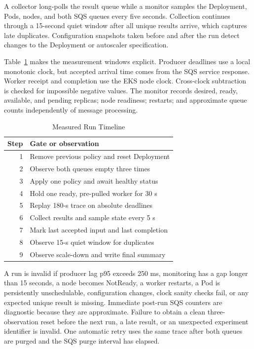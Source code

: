 \documentclass[conference]{IEEEtran}
\begin{document}
A collector long-polls the result queue while a monitor samples the Deployment,
Pods, nodes, and both SQS queues every five seconds. Collection continues through
a 15-second quiet window after all unique results arrive, which captures late
duplicates. Configuration snapshots taken before and after the run detect
changes to the Deployment or autoscaler specification.

Table~\ref{tab:timeline} makes the measurement windows explicit. Producer
deadlines use a local monotonic clock, but accepted arrival time comes from the
SQS service response. Worker receipt and completion use the EKS node clock.
Cross-clock subtraction is checked for impossible negative values. The monitor
records desired, ready, available, and pending replicas; node readiness;
restarts; and approximate queue counts independently of message processing.

\begin{table}[t]
  \caption{Measured Run Timeline}
  \label{tab:timeline}
  \centering
  \begin{tabular}{rl}
    \toprule
    Step & Gate or observation \\
    \midrule
    1 & Remove previous policy and reset Deployment \\
    2 & Observe both queues empty three times \\
    3 & Apply one policy and await healthy status \\
    4 & Hold one ready, pre-pulled worker for 30 s \\
    5 & Replay 180-s trace on absolute deadlines \\
    6 & Collect results and sample state every 5 s \\
    7 & Mark last accepted input and last completion \\
    8 & Observe 15-s quiet window for duplicates \\
    9 & Observe scale-down and write final summary \\
    \bottomrule
  \end{tabular}
\end{table}

A run is invalid if producer lag p95 exceeds 250 ms, monitoring has a gap longer
than 15 seconds, a node becomes NotReady, a worker restarts, a Pod is persistently
unschedulable, configuration changes, clock sanity checks fail, or any expected
unique result is missing. Immediate post-run SQS counters are diagnostic because
they are approximate. Failure to obtain a clean three-observation reset before
the next run, a late result, or an unexpected experiment identifier is invalid.
One automatic retry uses the same trace after both queues are purged and the SQS
purge interval has elapsed.
\end{document}
